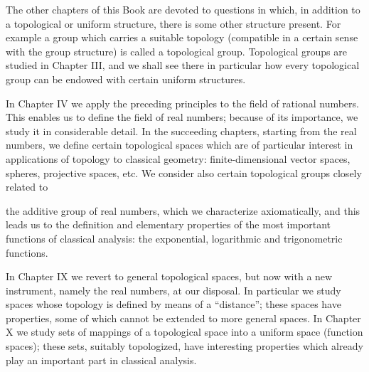 The other chapters of this Book are devoted to questions in which, in addition to a topological or uniform structure, there is some other structure present. For example a group which carries a suitable topology (compatible in a certain sense with the group structure) is called a topological group. Topological groups are studied in Chapter III, and we shall see there in particular how every topological group can be endowed with certain uniform structures.

In Chapter IV we apply the preceding principles to the field of rational numbers. This enables us to define the field of real numbers; because of its importance, we study it in considerable detail. In the succeeding chapters, starting from the real numbers, we define certain topological spaces which are of particular interest in applications of topology to classical geometry: finite-dimensional vector spaces, spheres, projective spaces, etc. We consider also certain topological groups closely related to

the additive group of real numbers, which we characterize axiomatically, and this leads us to the definition and elementary properties of the most important functions of classical analysis: the exponential, logarithmic and trigonometric functions.

In Chapter IX we revert to general topological spaces, but now with a new instrument, namely the real numbers, at our disposal. In particular we study spaces whose topology is defined by means of a ``distance''; these spaces have properties, some of which cannot be extended to more general spaces. In Chapter X we study sets of mappings of a topological space into a uniform space (function spaces); these sets, suitably topologized, have interesting properties which already play an important part in classical analysis.

